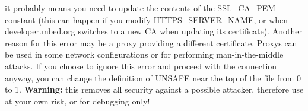 it probably means you need to update the contents of the {\ttfamily S\-S\-L\-\_\-\-C\-A\-\_\-\-P\-E\-M} constant (this can happen if you modify {\ttfamily H\-T\-T\-P\-S\-\_\-\-S\-E\-R\-V\-E\-R\-\_\-\-N\-A\-M\-E}, or when {\ttfamily developer.\-mbed.\-org} switches to a new C\-A when updating its certificate). Another reason for this error may be a proxy providing a different certificate. Proxys can be used in some network configurations or for performing man-\/in-\/the-\/middle attacks. If you choose to ignore this error and proceed with the connection anyway, you can change the definition of {\ttfamily U\-N\-S\-A\-F\-E} near the top of the file from 0 to 1. {\bfseries Warning\-:} this removes all security against a possible attacker, therefore use at your own risk, or for debugging only! 